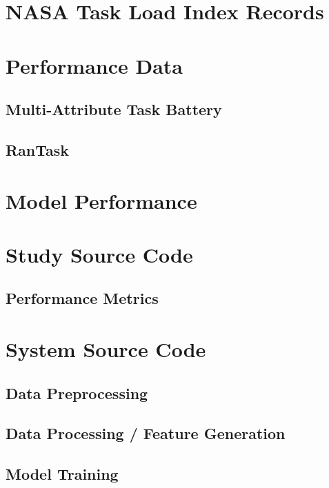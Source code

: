 \documentclass[11pt]{article}
\begin{document}
\pagebreak
\begin{appendices}
\appendixpage
\noappendicestocpagenum
\addappheadtotoc
\section{NASA Task Load Index Records}
\section{Performance Data}
	\subsection{Multi-Attribute Task Battery}
	\subsection{RanTask}
\section{Model Performance}
\section{Study Source Code}
	\subsection{Performance Metrics}
\section{System Source Code}
	\subsection{Data Preprocessing}
	\subsection{Data Processing / Feature Generation}
	\subsection{Model Training}
\end{appendices}	
\end{document}
